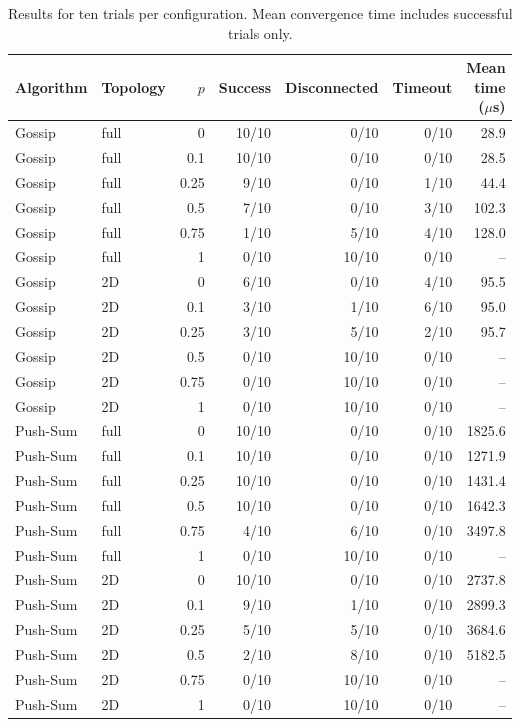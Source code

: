 \begin{table}[H]
\centering\small
\begin{tabular}{llrrrrr}
\toprule
Algorithm & Topology & $p$ & Success & Disconnected & Timeout & Mean time ($\mu$s) \\
\midrule
Gossip & full & 0 & 10/10 & 0/10 & 0/10 & 28.9 \\
Gossip & full & 0.1 & 10/10 & 0/10 & 0/10 & 28.5 \\
Gossip & full & 0.25 & 9/10 & 0/10 & 1/10 & 44.4 \\
Gossip & full & 0.5 & 7/10 & 0/10 & 3/10 & 102.3 \\
Gossip & full & 0.75 & 1/10 & 5/10 & 4/10 & 128.0 \\
Gossip & full & 1 & 0/10 & 10/10 & 0/10 & -- \\
Gossip & 2D & 0 & 6/10 & 0/10 & 4/10 & 95.5 \\
Gossip & 2D & 0.1 & 3/10 & 1/10 & 6/10 & 95.0 \\
Gossip & 2D & 0.25 & 3/10 & 5/10 & 2/10 & 95.7 \\
Gossip & 2D & 0.5 & 0/10 & 10/10 & 0/10 & -- \\
Gossip & 2D & 0.75 & 0/10 & 10/10 & 0/10 & -- \\
Gossip & 2D & 1 & 0/10 & 10/10 & 0/10 & -- \\
Push-Sum & full & 0 & 10/10 & 0/10 & 0/10 & 1825.6 \\
Push-Sum & full & 0.1 & 10/10 & 0/10 & 0/10 & 1271.9 \\
Push-Sum & full & 0.25 & 10/10 & 0/10 & 0/10 & 1431.4 \\
Push-Sum & full & 0.5 & 10/10 & 0/10 & 0/10 & 1642.3 \\
Push-Sum & full & 0.75 & 4/10 & 6/10 & 0/10 & 3497.8 \\
Push-Sum & full & 1 & 0/10 & 10/10 & 0/10 & -- \\
Push-Sum & 2D & 0 & 10/10 & 0/10 & 0/10 & 2737.8 \\
Push-Sum & 2D & 0.1 & 9/10 & 1/10 & 0/10 & 2899.3 \\
Push-Sum & 2D & 0.25 & 5/10 & 5/10 & 0/10 & 3684.6 \\
Push-Sum & 2D & 0.5 & 2/10 & 8/10 & 0/10 & 5182.5 \\
Push-Sum & 2D & 0.75 & 0/10 & 10/10 & 0/10 & -- \\
Push-Sum & 2D & 1 & 0/10 & 10/10 & 0/10 & -- \\
\bottomrule
\end{tabular}
\caption{Results for ten trials per configuration. Mean convergence time includes successful trials only.}\label{tab:results}
\end{table}

